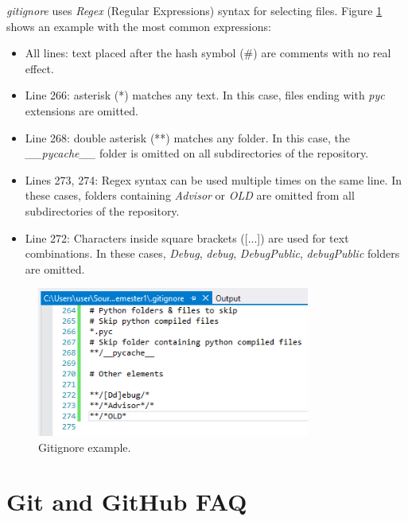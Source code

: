 \textit{gitignore} uses \textit{Regex} (Regular Expressions) syntax for selecting files. Figure \ref{fig:GitIgnore1} shows an example with the most common expressions:

\begin{itemize}
	\item All lines: text placed after the hash symbol (\#) are comments with no real effect.
	\item Line 266: asterisk (*) matches any text. In this case, files ending with \textit{pyc} extensions are omitted.
	\item Line 268: double asterisk (**) matches any folder. In this case, the \textit{\_\_pycache\_\_} folder is omitted on all subdirectories of the repository.
	\item Lines 273, 274: Regex syntax can be used multiple times on the same line. In these cases, folders containing \textit{Advisor} or \textit{OLD} are omitted from all subdirectories of the repository.
	\item Line 272: Characters inside square brackets ([...]) are used for text combinations. In these cases, \textit{Debug}, \textit{debug}, \textit{DebugPublic}, \textit{debugPublic} folders are omitted.
\end{itemize}

\begin{figure}[h]
	\centering
	\includegraphics[width= 0.8\textwidth]{Figures/GIG1.png}
	\caption{Gitignore example.}
	\label{fig:GitIgnore1}
\end{figure}

    \section{Git and GitHub FAQ}


